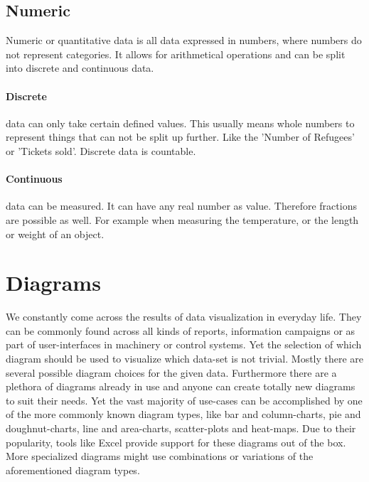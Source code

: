 \subsection{Numeric}

Numeric or quantitative data is all data expressed in numbers, where numbers do not represent categories. It allows for arithmetical operations and can be split into discrete and continuous data.

\paragraph{Discrete}
data can only take certain defined values. This usually means whole numbers to represent things that can not be split up further. Like the 'Number of Refugees' or 'Tickets sold'. Discrete data is countable.

\paragraph{Continuous}
data can be measured. It can have any real number as value. Therefore fractions are possible as well. For example when measuring the temperature, or the length or weight of an object.


\section{Diagrams}

We constantly come across the results of data visualization in everyday life. They can be commonly found across all kinds of reports, information campaigns or as part of user-interfaces in machinery or control systems. Yet the selection of which diagram should be used to visualize which data-set is not trivial. Mostly there are several possible diagram choices for the given data. Furthermore there are a plethora of diagrams already in use and anyone can create totally new diagrams to suit their needs. Yet the vast majority of use-cases can be accomplished by one of the more commonly known diagram types, like bar and column-charts, pie and doughnut-charts, line and area-charts, scatter-plots and heat-maps. Due to their popularity, tools like Excel provide support for these diagrams out of the box\cite{office_chart_types}. More specialized diagrams might use combinations or variations of the aforementioned diagram types. 

